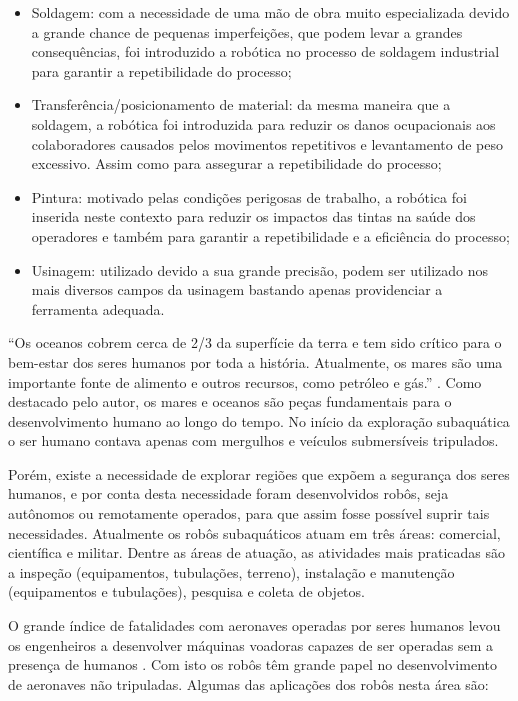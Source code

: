 \begin{itemize}
	\item Soldagem: com a necessidade de uma mão de obra muito especializada devido a grande chance de pequenas imperfeições, que podem levar a grandes consequências, foi introduzido a robótica no processo de soldagem industrial para garantir a repetibilidade do processo;
	
	\item Transferência/posicionamento de material: da mesma maneira que a soldagem, a robótica foi introduzida para reduzir os danos ocupacionais aos colaboradores causados pelos movimentos repetitivos e levantamento de peso excessivo. Assim como para assegurar a repetibilidade do processo;
	
	\item Pintura: motivado pelas condições perigosas de trabalho, a robótica foi inserida neste contexto para reduzir os impactos das tintas na saúde dos operadores e também para garantir a repetibilidade e a eficiência do processo;
	
	\item Usinagem: utilizado devido a sua grande precisão, podem ser utilizado nos mais diversos campos da usinagem bastando apenas providenciar a ferramenta adequada.
\end{itemize}

“Os oceanos cobrem cerca de 2/3 da superfície da terra e tem sido crítico para o bem-estar dos seres humanos por toda a história. Atualmente, os mares são uma importante fonte de alimento e outros recursos, como petróleo e gás.” \cite{siciliano2016}. Como destacado pelo autor, os mares e oceanos são peças fundamentais para o desenvolvimento humano ao longo do tempo. No início da exploração subaquática o ser humano contava apenas com mergulhos e veículos submersíveis tripulados. 

Porém, existe a necessidade de explorar regiões que expõem a segurança dos seres humanos, e por conta desta necessidade foram desenvolvidos robôs, seja autônomos ou remotamente operados,  para que assim fosse possível suprir tais necessidades. Atualmente os robôs subaquáticos atuam em três áreas: comercial, científica e militar. Dentre as áreas de atuação, as atividades mais praticadas são a inspeção (equipamentos, tubulações, terreno), instalação e manutenção (equipamentos e tubulações), pesquisa e coleta de objetos.

O grande índice de fatalidades com aeronaves operadas por seres humanos levou os engenheiros a desenvolver máquinas voadoras capazes de ser operadas sem a presença de humanos \cite{siciliano2016}. Com isto os robôs têm grande papel no desenvolvimento de aeronaves não tripuladas. Algumas das aplicações dos robôs nesta área são:

